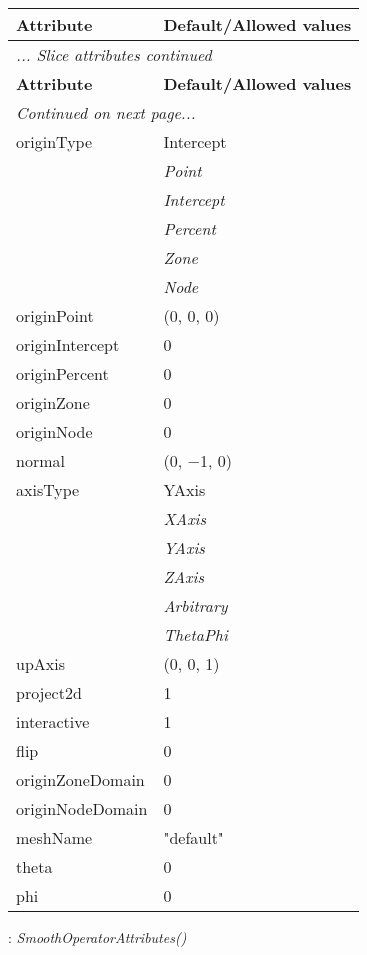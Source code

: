 \documentclass[10pt,a4paper]{report}
\begin{document}
\begin{longtable}{ll}
{\bf Attribute} & {\bf Default/Allowed values} \\
\hline \hline
\endfirsthead
\multicolumn{2}{l}{{\it ... Slice attributes continued}} \\
{\bf Attribute} & {\bf Default/Allowed values} \\
\hline \hline
\endhead
\hline
\multicolumn{2}{l}{{\it Continued on next page...}} \\
\endfoot
\hline
\endlastfoot

originType  &  Intercept   \\
 & {\it  Point} \\
 & {\it  Intercept} \\
 & {\it  Percent} \\
 & {\it  Zone} \\
 & {\it  Node} \\
originPoint  &  (0, 0, 0) \\
originIntercept  &  0 \\
originPercent  &  0 \\
originZone  &  0 \\
originNode  &  0 \\
normal  &  (0, $-$1, 0) \\
axisType  &  YAxis   \\
 & {\it  XAxis} \\
 & {\it  YAxis} \\
 & {\it  ZAxis} \\
 & {\it  Arbitrary} \\
 & {\it  ThetaPhi} \\
upAxis  &  (0, 0, 1) \\
project2d  &  1 \\
interactive  &  1 \\
flip  &  0 \\
originZoneDomain  &  0 \\
originNodeDomain  &  0 \\
meshName  &  "default" \\
theta  &  0 \\
phi  &  0 \\
\end{longtable}

\newpage

{}
: {\it SmoothOperatorAttributes() }\\[-3mm]
\end{document}
